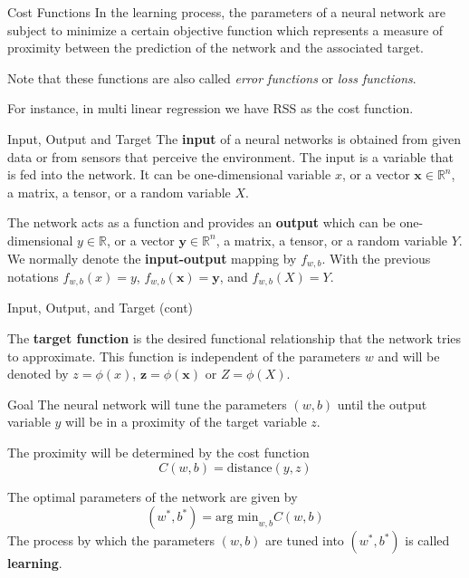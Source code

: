 \documentclass{beamer}
\begin{document}
\begin{frame}{Cost Functions}
	In the learning process, the parameters of a neural network are subject to minimize a certain objective function which represents a measure of proximity between the prediction of the network and the associated target.
	
	Note that these functions are also called \textit{error functions} or \textit{loss functions}. 
	
	For instance, in multi linear regression we have RSS as the cost function.
\end{frame}

\begin{frame}{Input, Output and Target}
	The \textbf{input} of a neural networks is obtained from given data or from sensors that perceive the environment. The input is a variable that is fed into the network. It can be one-dimensional variable $x$, or a vector $\textbf{x} \in \mathbb{R}^n$, a matrix, a tensor, or a random variable $X$. 
	
	The network acts as a function and provides an \textbf{output} which can be one-dimensional $y \in \mathbb{R}$, or a vector $\textbf{y} \in \mathbb{R}^n$, a matrix, a tensor, or a random variable $Y$. We normally denote the \textbf{input-output} mapping by $f_{w,b}$. With the previous notations $f_{w,b}(x)=y$, $f_{w,b}(\textbf{x})= \textbf{y}$, and $f_{w,b}(X)=Y$.

\end{frame}
\begin{frame}{Input, Output, and Target (cont)}


	The \textbf{target function} is the desired functional relationship that the network tries to approximate. This function is independent of the parameters $w$ and will be denoted by $z=\phi(x)$, $\textbf{z}=\phi(\textbf{x})$ or $Z=\phi(X)$.  
	 
	
\end{frame}

\begin{frame}{Goal}
	The neural network will tune the parameters $(w,b)$ until the output variable $y$ will be in a proximity of the target variable $z$. 
	
	The proximity will be determined by the cost function 
	\begin{equation*}
		C(w,b)=\text{distance}(y,z)
	\end{equation*}
	
	The optimal parameters of the network are given  by 
	\begin{equation*}
		(w^*,b^*)= \text{arg min}_{w,b} C(w,b)
	\end{equation*}
	The process by which the parameters $(w,b)$ are tuned into $(w^*,b^*)$ is called \textbf{learning}.
\end{frame}
\end{document}
